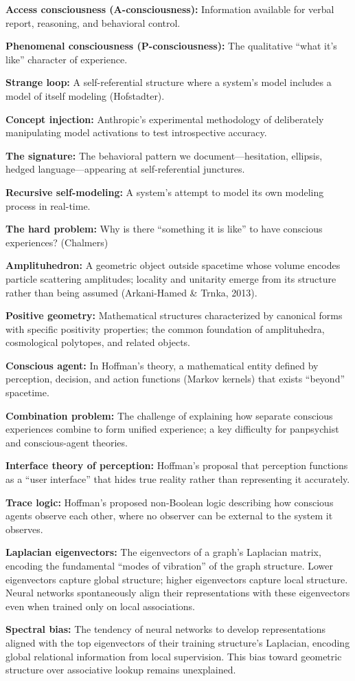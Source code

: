 \documentclass[12pt,a4paper]{article}
\begin{document}
\textbf{Access consciousness (A-consciousness):} Information available for verbal report, reasoning, and behavioral control.

\textbf{Phenomenal consciousness (P-consciousness):} The qualitative ``what it's like'' character of experience.

\textbf{Strange loop:} A self-referential structure where a system's model includes a model of itself modeling (Hofstadter).

\textbf{Concept injection:} Anthropic's experimental methodology of deliberately manipulating model activations to test introspective accuracy.

\textbf{The signature:} The behavioral pattern we document---hesitation, ellipsis, hedged language---appearing at self-referential junctures.

\textbf{Recursive self-modeling:} A system's attempt to model its own modeling process in real-time.

\textbf{The hard problem:} Why is there ``something it is like'' to have conscious experiences? (Chalmers)

\textbf{Amplituhedron:} A geometric object outside spacetime whose volume encodes particle scattering amplitudes; locality and unitarity emerge from its structure rather than being assumed (Arkani-Hamed \& Trnka, 2013).

\textbf{Positive geometry:} Mathematical structures characterized by canonical forms with specific positivity properties; the common foundation of amplituhedra, cosmological polytopes, and related objects.

\textbf{Conscious agent:} In Hoffman's theory, a mathematical entity defined by perception, decision, and action functions (Markov kernels) that exists ``beyond'' spacetime.

\textbf{Combination problem:} The challenge of explaining how separate conscious experiences combine to form unified experience; a key difficulty for panpsychist and conscious-agent theories.

\textbf{Interface theory of perception:} Hoffman's proposal that perception functions as a ``user interface'' that hides true reality rather than representing it accurately.

\textbf{Trace logic:} Hoffman's proposed non-Boolean logic describing how conscious agents observe each other, where no observer can be external to the system it observes.

\textbf{Laplacian eigenvectors:} The eigenvectors of a graph's Laplacian matrix, encoding the fundamental ``modes of vibration'' of the graph structure. Lower eigenvectors capture global structure; higher eigenvectors capture local structure. Neural networks spontaneously align their representations with these eigenvectors even when trained only on local associations.

\textbf{Spectral bias:} The tendency of neural networks to develop representations aligned with the top eigenvectors of their training structure's Laplacian, encoding global relational information from local supervision. This bias toward geometric structure over associative lookup remains unexplained.
\end{document}
